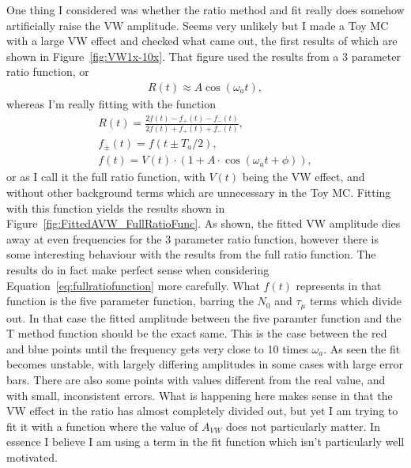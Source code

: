 \documentclass[12pt,letterpaper]{article}
\newcommand{\figref}[1]{Figure~\ref{#1}}
\def\wa{$\omega_{a}$\xspace}
\begin{document}
One thing I considered was whether the ratio method and fit really does somehow artificially raise the VW amplitude. Seems very unlikely but I made a Toy MC with a large VW effect and checked what came out, the first results of which are shown in \figref{fig:VW1x-10x}. That figure used the results from a 3 parameter ratio function, or 
    \begin{align} \label{eq:threeparamratio}
        R(t) \approx A \cos(\omega_{a}t),
    \end{align}
whereas I'm really fitting with the function
    \begin{gather}
        R(t) = \frac{2f(t) - f_{+}(t) - f_{-}(t)}{2f(t) + f_{+}(t) + f_{-}(t)}, \\
        f_{\pm}(t) = f(t \pm T_{a}/2), \\
        f(t) = V(t) \cdot (1 + A \cdot \cos(\omega_{a}t + \phi)),
    \label{eq:fullratiofunction}
    \end{gather}
or as I call it the full ratio function, with $V(t)$ being the VW effect, and without other background terms which are unnecessary in the Toy MC. Fitting with this function yields the results shown in \figref{fig:FittedAVW_FullRatioFunc}. As shown, the fitted VW amplitude dies away at even frequencies for the 3 parameter ratio function, however there is some interesting behaviour with the results from the full ratio function. The results do in fact make perfect sense when considering Equation~\ref{eq:fullratiofunction} more carefully. What $f(t)$ represents in that function is the five parameter function, barring the $N_{0}$ and $\tau_{\mu}$ terms which divide out. In that case the fitted amplitude between the five paramter function and the T method function should be the exact same. This is the case between the red and blue points until the frequency gets very close to 10 times \wa. As seen the fit becomes unstable, with largely differing amplitudes in some cases with large error bars. There are also some points with values different from the real value, and with small, inconsistent errors. What is happening here makes sense in that the VW effect in the ratio has almost completely divided out, but yet I am trying to fit it with a function where the value of $A_{VW}$ does not particularly matter. In essence I believe I am using a term in the fit function which isn't particularly well motivated. 
\end{document}
